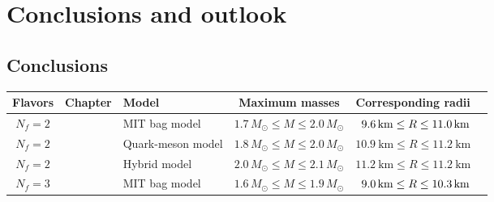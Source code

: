 \chapter{Conclusions and outlook}

\section{Conclusions}

\begin{table}[b!]
\centering
{\setlength{\tabcolsep}{4pt} %
\begin{tabular}{ c l l c c c }
	\toprule
	Flavors & Chapter & Model & Maximum masses & Corresponding radii                            \\
	\midrule
	$N_f=2$ & \Cref{chap:mit} & MIT bag model & $1.7 \, M_\odot \leq M \leq 2.0 \, M_\odot$ & $\hphantom{1}\SI{9.6}{\kilo\meter} \leq R \leq \SI{11.0}{\kilo\meter}$ \\
	$N_f=2$ & \Cref{chap:lsm2f} & Quark-meson model & $1.8 \, M_\odot \leq M \leq 2.0 \, M_\odot$ & $\SI{10.9}{\kilo\meter} \leq R \leq \SI{11.2}{\kilo\meter}$ \\
	$N_f=2$ & \Cref{chap:hybrid} & Hybrid model & $2.0 \, M_\odot \leq M \leq 2.1 \, M_\odot$ & $\SI{11.2}{\kilo\meter} \leq R \leq \SI{11.2}{\kilo\meter}$ \\
	\midrule
	$N_f=3$ & \Cref{chap:mit} & MIT bag model & $1.6 \, M_\odot \leq M \leq 1.9 \, M_\odot$ & $\hphantom{1}\SI{9.0}{\kilo\meter} \leq R \leq \SI{10.3}{\kilo\meter}$ \\

\end{tabular}}
\end{table}
